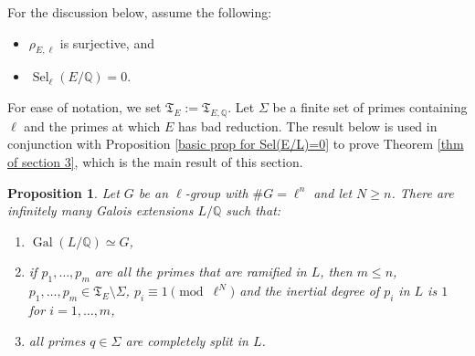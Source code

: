 \documentclass[11pt,reqno]{amsart}
\newtheorem{proposition}[theorem]{Proposition}
\newcommand{\Q}{\mathbb{Q}}
\newcommand{\op}[1]{\operatorname{#1}}
\numberwithin{equation}{section}
\begin{document}
For the discussion below, assume the following:
\begin{itemize}
    \item $\rho_{E,\ell}$ is surjective, and
    \item $\op{Sel}_\ell(E/\Q)=0$.
\end{itemize}
For ease of notation, we set $\mathfrak{T}_E:=\mathfrak{T}_{E,\Q}$. Let $\Sigma$ be a finite set of primes containing $\ell$ and the primes at which $E$ has bad reduction. The result below is used in conjunction with Proposition \ref{basic prop for Sel(E/L)=0} to prove Theorem \ref{thm of section 3}, which is the main result of this section.
\begin{proposition}\label{technical propn}
    Let $G$ be an $\ell$-group with $\#G=\ell^n$ and let $N\geq n$. There are infinitely many Galois extensions $L/\Q$ such that:
    \begin{enumerate}[label=(\roman*)]
        \item $\op{Gal}(L/\Q)\simeq G$, 
        \item if $p_1, \dots, p_m$ are all the primes that are ramified in $L$, then $m\leq n$, $p_1, \dots, p_m\in \mathfrak{T}_E\setminus \Sigma$, $p_i\equiv 1\pmod{\ell^N}$ and the inertial degree of $p_i$ in $L$ is $1$ for $i=1, \dots, m$,
        \item all primes $q\in \Sigma$ are completely split in $L$. 
    \end{enumerate}
\end{proposition}
\end{document}
